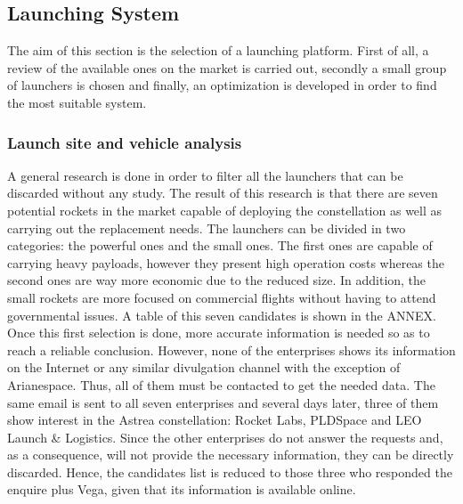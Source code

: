 

\subsection{Launching System}
The aim of this section is the selection of a launching platform. First of all, a review of the available ones on the market is carried out, secondly a small group of launchers is chosen and finally, an optimization is developed in order to find the most suitable system. 
	\subsubsection{Launch site and vehicle analysis}
A general research is done in order to filter all the launchers that can be discarded without any study. The result of this research is that there are seven potential rockets in the market capable of deploying the constellation as well as carrying out the replacement needs. The launchers can be divided in two categories: the powerful ones and the small ones. The first ones are capable of carrying heavy payloads, however they present high operation costs whereas the second ones are way more economic due to the reduced size. In addition, the small rockets are more focused on commercial flights without having to attend governmental issues. A table of this seven candidates is shown in the ANNEX.
\newline
Once this first selection is done, more accurate information is needed so as to reach a reliable conclusion. However, none of the enterprises shows its information on the Internet or any similar divulgation channel with the exception of Arianespace. Thus, all of them must be contacted to get the needed data. The same email is sent to all seven enterprises and several days later, three of them show interest in the Astrea constellation: Rocket Labs, PLDSpace and LEO Launch \& Logistics. Since the other enterprises do not answer the requests and, as a consequence, will not provide the necessary information, they can be directly discarded. Hence, the candidates list is reduced to those three who responded the enquire plus Vega, given that its information is available online. 
\newline
